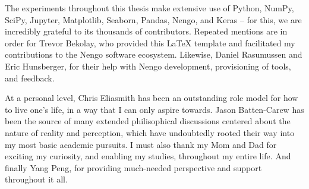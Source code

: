 The experiments throughout this thesis make extensive use of Python, NumPy, SciPy, Jupyter, Matplotlib, Seaborn, Pandas, Nengo, and Keras -- for this, we are incredibly grateful to its thousands of contributors.
Repeated mentions are in order for Trevor Bekolay, who provided this \LaTeX{} template and facilitated my contributions to the Nengo software ecosystem.
Likewise, Daniel Rasumussen and Eric Hunsberger, for their help with Nengo development, provisioning of tools, and feedback.

At a personal level, Chris Eliasmith has been an outstanding role model for how to live one's life, in a way that I can only aspire towards.
Jason Batten-Carew has been the source of many extended philisophical discussions centered about the nature of reality and perception, which have undoubtedly rooted their way into my most basic academic pursuits.
I must also thank my Mom and Dad for exciting my curiosity, and enabling my studies, throughout my entire life.
And finally Yang Peng, for providing much-needed perspective and support throughout it all.

\cleardoublepage
